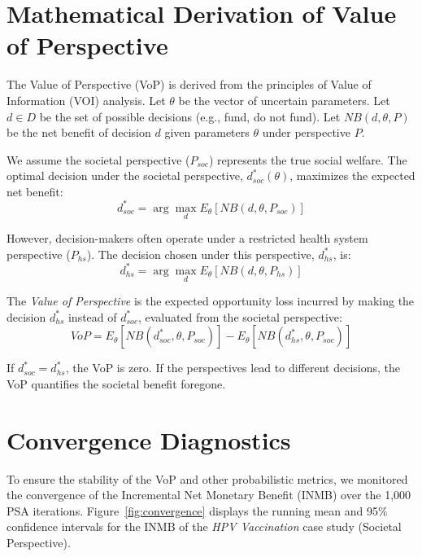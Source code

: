 \documentclass{article}
\author{Dylan A. Mordaunt\\Victoria University of Wellington}
\newcommand{\myabstract}{}
\begin{document}
\maketitle
\begin{abstract}
\myabstract
\end{abstract}

\section{Mathematical Derivation of Value of Perspective}

The Value of Perspective (VoP) is derived from the principles of Value of Information (VOI) analysis.
Let $\theta$ be the vector of uncertain parameters.
Let $d \in D$ be the set of possible decisions (e.g., fund, do not fund).
Let $NB(d, \theta, P)$ be the net benefit of decision $d$ given parameters $\theta$ under perspective $P$.

We assume the societal perspective ($P_{soc}$) represents the true social welfare.
The optimal decision under the societal perspective, $d^*_{soc}(\theta)$, maximizes the expected net benefit:
\begin{equation}
d^*_{soc} = \arg\max_{d} E_{\theta}[NB(d, \theta, P_{soc})]
\end{equation}

However, decision-makers often operate under a restricted health system perspective ($P_{hs}$).
The decision chosen under this perspective, $d^*_{hs}$, is:
\begin{equation}
d^*_{hs} = \arg\max_{d} E_{\theta}[NB(d, \theta, P_{hs})]
\end{equation}

The \emph{Value of Perspective} is the expected opportunity loss incurred by making the decision $d^*_{hs}$ instead of $d^*_{soc}$, evaluated from the societal perspective:
\begin{equation}
VoP = E_{\theta}[NB(d^*_{soc}, \theta, P_{soc})] - E_{\theta}[NB(d^*_{hs}, \theta, P_{soc})]
\end{equation}

If $d^*_{soc} = d^*_{hs}$, the VoP is zero. If the perspectives lead to different decisions, the VoP quantifies the societal benefit foregone.

\section{Convergence Diagnostics}

To ensure the stability of the VoP and other probabilistic metrics, we monitored the convergence of the Incremental Net Monetary Benefit (INMB) over the 1,000 PSA iterations.
Figure~\ref{fig:convergence} displays the running mean and 95\% confidence intervals for the INMB of the \emph{HPV Vaccination} case study (Societal Perspective).
\end{document}
